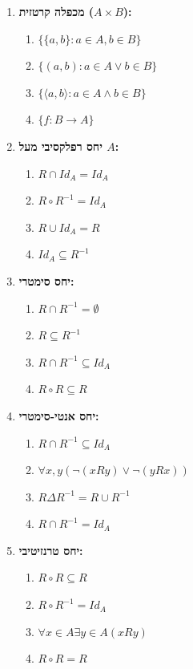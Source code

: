 \documentclass[a4paper,11pt]{article}
\begin{document}
\begin{enumerate}
    \item \textbf{מכפלה קרטזית (\(A \times B\)):}
          \begin{enumerate}
              \item \(\{\{a,b\} : a \in A, b \in B\}\)
              \item \(\{(a,b) : a \in A \lor b \in B\}\)
              \item \(\{\langle a,b \rangle : a \in A \land b \in B\}\)
              \item \(\{f : B \to A\}\)
          \end{enumerate}

    \item \textbf{יחס רפלקסיבי מעל \(A\):}
          \begin{enumerate}
              \item \(R \cap Id_A = Id_A\)
              \item \(R \circ R^{-1} = Id_A\)
              \item \(R \cup Id_A = R\)
              \item \(Id_A \subseteq R^{-1}\)
          \end{enumerate}

    \item \textbf{יחס סימטרי:}
          \begin{enumerate}
              \item \(R \cap R^{-1} = \emptyset\)
              \item \(R \subseteq R^{-1}\)
              \item \(R \cap R^{-1} \subseteq Id_A\)
              \item \(R \circ R \subseteq R\)
          \end{enumerate}

    \item \textbf{יחס אנטי-סימטרי:}
          \begin{enumerate}
              \item \(R \cap R^{-1} \subseteq Id_A\)
              \item \(\forall x,y (\neg(xRy) \lor \neg(yRx))\)
              \item \(R \Delta R^{-1} = R \cup R^{-1}\)
              \item \(R \cap R^{-1} = Id_A\)
          \end{enumerate}

    \item \textbf{יחס טרנזיטיבי:}
          \begin{enumerate}
              \item \(R \circ R \subseteq R\)
              \item \(R \circ R^{-1} = Id_A\)
              \item \(\forall x \in A \exists y \in A (xRy)\)
              \item \(R \circ R = R\)
          \end{enumerate}


\end{enumerate}
\end{document}
